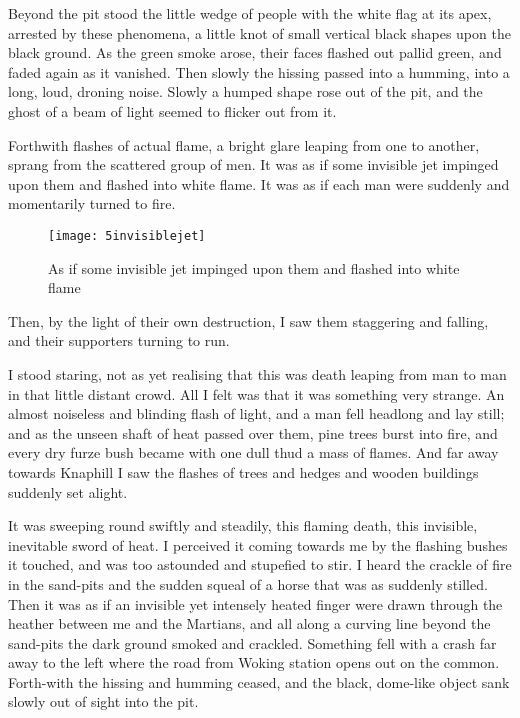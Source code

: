 Beyond the pit stood the little wedge of people with the white flag at its apex, arrested by these phenomena, a little knot of small vertical black shapes upon the black ground. As the green smoke arose, their faces flashed out pallid green, and faded again as it vanished. Then slowly the hissing passed into a humming, into a long, loud, droning noise. Slowly a humped shape rose out of the pit, and the ghost of a beam of light seemed to flicker out from it.

Forthwith flashes of actual flame, a bright glare leaping from one to another, sprang from the scattered group of men. It was as if some invisible jet impinged upon them and flashed into white flame. It was as if each man were suddenly and momentarily turned to fire.

\begin{sidewaysfigure}
	\texttt{[image: 5invisiblejet]}%
\caption[Flashed into white flame]{As if some invisible jet impinged upon them and flashed into white flame}
\end{sidewaysfigure}

Then, by the light of their own destruction, I saw them staggering and falling, and their supporters turning to run.

I stood staring, not as yet realising that this was death leaping from man to man in that little distant crowd. All I felt was that it was something very strange. An almost noiseless and blinding flash of light, and a man fell headlong and lay still; and as the unseen shaft of heat passed over them, pine trees burst into fire, and every dry furze bush became with one dull thud a mass of flames. And far away towards Knaphill I saw the flashes of trees and hedges and wooden buildings suddenly set alight.

It was sweeping round swiftly and steadily, this flaming death, this invisible, inevitable sword of heat. I perceived it coming towards me by the flashing bushes it touched, and was too astounded and stupefied to stir. I heard the crackle of fire in the sand-pits and the sudden squeal of a horse that was as suddenly stilled. Then it was as if an invisible yet intensely heated finger were drawn through the heather between me and the Martians, and all along a curving line beyond the sand-pits the dark ground smoked and crackled. Something fell with a crash far away to the left where the road from Woking station opens out on the common. Forth-with the hissing and humming ceased, and the black, dome-like object sank slowly out of sight into the pit.



